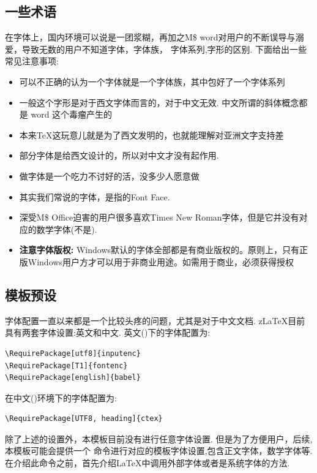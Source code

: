 \subsection{一些术语}
在字体上，国内环境可以说是一团浆糊，再加之M\$ word对用户的不断误导与溺爱，导致无数的用户不知道字体，字体族，
字体系列,字形的区别. 下面给出一些常见注意事项:
\begin{itemize}
    \item 可以不正确的认为一个字体就是一个字体族，其中包好了一个字体系列
    \item 一般这个字形是对于西文字体而言的，对于中文无效. 中文所谓的斜体概念都是 word 这个毒瘤产生的
    \item 本来\TeX{}这玩意儿就是为了西文发明的，也就能理解对亚洲文字支持差
    \item 部分字体是给西文设计的，所以对中文才没有起作用.
    \item 做字体是一个吃力不讨好的活，没多少人愿意做
    \item 其实我们常说的字体，是指的Font Face.
    \item 深受M\$ Office迫害的用户很多喜欢Times New Roman字体，但是它并没有对应的数学字体(不是).
    \item \textbf{注意字体版权:} Windows默认的字体全部都是有商业版权的。原则上，只有正版Windows用户方才可以用于非商业用途。如需用于商业，必须获得授权
\end{itemize} 

\subsection{模板预设}
字体配置一直以来都是一个比较头疼的问题，尤其是对于中文文档. z\LaTeX{}目前具有两套字体设置:英文和中文.
英文()下的字体配置为:
\begin{verbatim}
\RequirePackage[utf8]{inputenc}
\RequirePackage[T1]{fontenc}
\RequirePackage[english]{babel} 
\end{verbatim}

在中文()环境下的字体配置为:
\begin{verbatim}
\RequirePackage[UTF8, heading]{ctex}
\end{verbatim}

除了上述的设置外，本模板目前没有进行任意字体设置. 但是为了方便用户，后续,本模板可能会提供一个
\cmd{\zlatexFontSetup}\index{\cmd{\zlatexFontSetup}}命令进行对应的模板字体设置,包含正文字体，数学字体等. 
在介绍此命令之前，首先介绍\LaTeX{}中调用外部字体或者是系统字体的方法.

